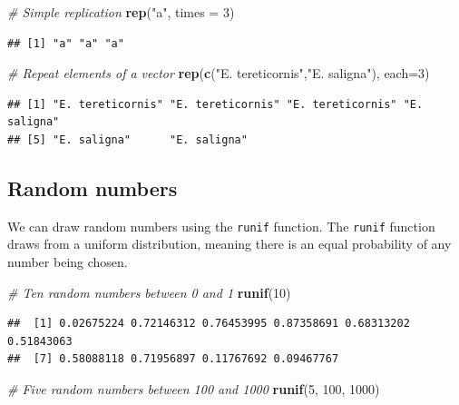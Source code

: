 \documentclass[]{book}
\newenvironment{Shaded}{\begin{snugshade}}{\end{snugshade}}
\newcommand{\CommentTok}[1]{\textcolor[rgb]{0.56,0.35,0.01}{\textit{#1}}}
\newcommand{\DataTypeTok}[1]{\textcolor[rgb]{0.13,0.29,0.53}{#1}}
\newcommand{\DecValTok}[1]{\textcolor[rgb]{0.00,0.00,0.81}{#1}}
\newcommand{\KeywordTok}[1]{\textcolor[rgb]{0.13,0.29,0.53}{\textbf{#1}}}
\newcommand{\NormalTok}[1]{#1}
\newcommand{\StringTok}[1]{\textcolor[rgb]{0.31,0.60,0.02}{#1}}
\begin{document}
\begin{Shaded}
\begin{Highlighting}[]
\CommentTok{# Simple replication}
\KeywordTok{rep}\NormalTok{(}\StringTok{"a"}\NormalTok{, }\DataTypeTok{times =} \DecValTok{3}\NormalTok{)}
\end{Highlighting}
\end{Shaded}

\begin{verbatim}
## [1] "a" "a" "a"
\end{verbatim}

\begin{Shaded}
\begin{Highlighting}[]
\CommentTok{# Repeat elements of a vector}
\KeywordTok{rep}\NormalTok{(}\KeywordTok{c}\NormalTok{(}\StringTok{"E. tereticornis"}\NormalTok{,}\StringTok{"E. saligna"}\NormalTok{), }\DataTypeTok{each=}\DecValTok{3}\NormalTok{)}
\end{Highlighting}
\end{Shaded}

\begin{verbatim}
## [1] "E. tereticornis" "E. tereticornis" "E. tereticornis" "E. saligna"     
## [5] "E. saligna"      "E. saligna"
\end{verbatim}

\hypertarget{randomnumbers}{%
\subsection{Random numbers}\label{randomnumbers}}

We can draw random numbers using the \texttt{runif} function. The \texttt{runif} function draws from a uniform distribution, meaning there is an equal probability of any number being chosen.

\begin{Shaded}
\begin{Highlighting}[]
\CommentTok{# Ten random numbers between 0 and 1}
\KeywordTok{runif}\NormalTok{(}\DecValTok{10}\NormalTok{)}
\end{Highlighting}
\end{Shaded}

\begin{verbatim}
##  [1] 0.02675224 0.72146312 0.76453995 0.87358691 0.68313202 0.51843063
##  [7] 0.58088118 0.71956897 0.11767692 0.09467767
\end{verbatim}

\begin{Shaded}
\begin{Highlighting}[]
\CommentTok{# Five random numbers between 100 and 1000}
\KeywordTok{runif}\NormalTok{(}\DecValTok{5}\NormalTok{, }\DecValTok{100}\NormalTok{, }\DecValTok{1000}\NormalTok{)}
\end{Highlighting}
\end{Shaded}
\end{document}
